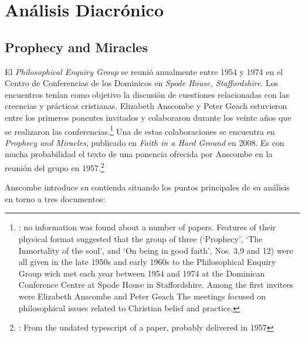 \section{Análisis Diacrónico}

\subsection{Prophecy and Miracles}

El \emph{Philosophical Enquiry Group} se reunió anualmente entre 1954 y 1974 en
el Centro de Conferencias de los Dominicos en \emph{Spode House, Staffordshire}.
Los encuentros tenían como objetivo la discusión de cuestiones relacionadas con
las creencias y prácticas cristianas. Elizabeth Anscombe y Peter Geach
estuvieron entre los primeros ponentes invitados y colaboraron durante los
veinte años que se realizaron las
conferencias.\footnote{\cite[Cf.~][x]{anscombe2008faith}: \textelp{} no
  information was found about a number of papers. Features of their physical
  format suggested that the group of three (`Prophecy', `The Inmortality of the
  soul', and `On being in good faith', Nos. 3,9 and 12) were all given in the
  late 1950s and early 1960s to the Philosophical Enquiry Group wich met each
  year between 1954 and 1974 at the Dominican Conference Centre at Spode House
  in Staffordshire. \textelp{} Among the first invitees were Elizabeth Anscombe
  and Peter Geach \textelp{} The meetings focused on philosophical issues
  related to Christian belief and practice.} Una de estas colaboraciones se
encuentra en \emph{Prophecy and Miracles}, publicado en \emph{Faith in a Hard
  Ground} en 2008. Es con mucha probabilidad el texto de una ponencia ofrecida
por Anscombe en la reunión del grupo en 1957.\footnote{\cite[Cf.~][nota a pie de
  página 20]{anscombe2008faith:prophandmi}: From the undated typescript of a
  paper, probably delivered in 1957}

Anscombe introduce su contienda situando los puntos principales de su análisis
en torno a tres documentos:

